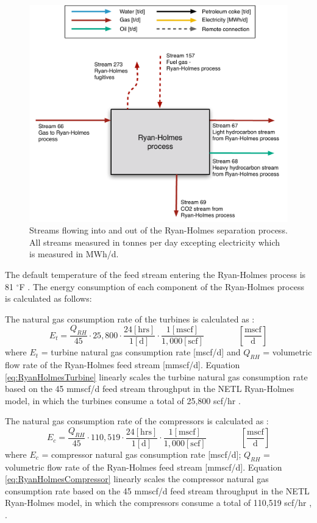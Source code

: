 \documentclass[11pt]{report}
\newcommand{\eqnunitfrac}[2]{\quad\quad \scriptstyle{\left[\frac{\text{#1}}{\text{#2}}\right]}}
\begin{document}
\begin{figure}
\includegraphics[width=0.85\columnwidth]{images/Ryan_holmes_PF.pdf}
\caption{Streams flowing into and out of the Ryan-Holmes separation process. All streams measured in tonnes per day excepting electricity which is measured in MWh/d.}
\label{fig:ryan_holmes_PF}
\end{figure}


The default temperature of the feed stream entering the Ryan-Holmes process is 81 $^{\circ}${F} \cite{NETLRyanHolmesModel}. The energy consumption of each component of the Ryan-Holmes process is calculated as follows:

The natural gas consumption rate of the turbines is calculated as \cite{NETLRyanHolmesModel}:
\begin{equation} \label{eq:RyanHolmesTurbine}
E_{t}=\frac{Q_{RH}}{45} \cdot 25,800 \cdot \frac{24 [\text{hrs}]}{1 [\text{d}]} \cdot \frac{1 [\text{mscf}]}{1,000 [\text{scf}]} \quad\quad\eqnunitfrac{mscf}{d}
\end{equation}
where $E_{t}$ = turbine natural gas consumption rate [mscf/d] and $Q_{RH}$ = volumetric flow rate of the Ryan-Holmes feed stream [mmscf/d]. Equation \ref{eq:RyanHolmesTurbine} linearly scales the turbine natural gas consumption rate based on the 45 mmscf/d feed stream throughput in the NETL Ryan-Holmes model, in which the turbines consume a total of 25,800 scf/hr \cite{NETLRyanHolmesModel}.

The natural gas consumption rate of the compressors is calculated as \cite{NETLRyanHolmesModel}:
\begin{equation} \label{eq:RyanHolmesCompressor}
E_{c}= \frac{Q_{RH}}{45} \cdot 110,519 \cdot \frac{24 [\text{hrs}]}{1 [\text{d}]} \cdot \frac{1 [\text{mscf}]}{1,000 [\text{scf}]} \quad\quad\eqnunitfrac{mscf}{d}
\end{equation}
where $E_{c}$ = compressor natural gas consumption rate [mscf/d]; $Q_{RH}$ = volumetric flow rate of the Ryan-Holmes feed stream [mmscf/d]. Equation \ref{eq:RyanHolmesCompressor} linearly scales the compressor natural gas consumption rate based on the 45 mmscf/d feed stream throughput in the NETL Ryan-Holmes model, in which the compressors consume a total of 110,519 scf/hr \cite{NETLRyanHolmesModel}, \cite{MilliganRyanHolmesPermit}. 
\end{document}
